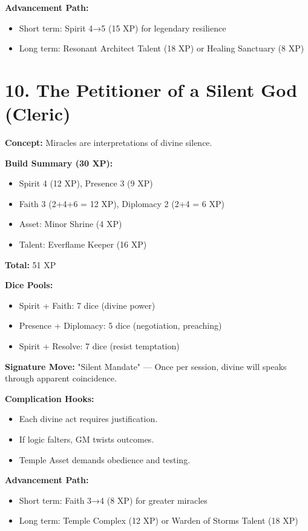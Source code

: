 \textbf{Advancement Path:}
\begin{itemize}
  \item Short term: Spirit 4→5 (15 XP) for legendary resilience
  \item Long term: Resonant Architect Talent (18 XP) or Healing Sanctuary (8 XP)
\end{itemize}

\section{10. The Petitioner of a Silent God (Cleric)}

\textbf{Concept:} Miracles are interpretations of divine silence.

\textbf{Build Summary (30 XP):}
\begin{itemize}
  \item Spirit 4 (12 XP), Presence 3 (9 XP)
  \item Faith 3 (2+4+6 = 12 XP), Diplomacy 2 (2+4 = 6 XP)
  \item Asset: Minor Shrine (4 XP)
  \item Talent: Everflame Keeper (16 XP)
\end{itemize}
\textbf{Total:} 51 XP

\textbf{Dice Pools:}
\begin{itemize}
  \item Spirit + Faith: 7 dice (divine power)
  \item Presence + Diplomacy: 5 dice (negotiation, preaching)
  \item Spirit + Resolve: 7 dice (resist temptation)
\end{itemize}

\textbf{Signature Move:} "Silent Mandate" — Once per session, divine will speaks through apparent coincidence.

\textbf{Complication Hooks:}
\begin{itemize}
  \item Each divine act requires justification.
  \item If logic falters, GM twists outcomes.
  \item Temple Asset demands obedience and testing.
\end{itemize}

\textbf{Advancement Path:}
\begin{itemize}
  \item Short term: Faith 3→4 (8 XP) for greater miracles
  \item Long term: Temple Complex (12 XP) or Warden of Storms Talent (18 XP)
\end{itemize}

